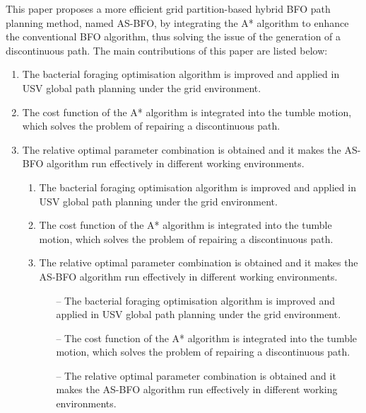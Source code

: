 \documentclass{PDS}%
\theoremstyle{definition}
\begin{document}
This paper proposes a more efficient grid partition-based hybrid BFO path planning
method, named AS-BFO, by integrating the A* algorithm to enhance the conventional
BFO algorithm, thus solving the issue of the generation of a discontinuous path. The main
contributions of this paper are listed below:
\begin{enumerate}
\item The bacterial foraging optimisation algorithm is improved and applied in USV
global path planning under the grid environment.

\item The cost function of the A* algorithm is integrated into the tumble motion, which
solves the problem of repairing a discontinuous path.

\item The relative optimal parameter combination is obtained and it makes the AS-BFO algorithm
run effectively in different working environments.\begin{enumerate}
\item The bacterial foraging optimisation algorithm is improved and applied in USV
global path planning under the grid environment.

\item The cost function of the A* algorithm is integrated into the tumble motion, which
solves the problem of repairing a discontinuous path.

\item The relative optimal parameter combination is obtained and it makes the AS-BFO algorithm
run effectively in different working environments.

\begin{enumerate}[--]
\item[--] The bacterial foraging optimisation algorithm is improved and applied in USV
global path planning under the grid environment.

\item[--] The cost function of the A* algorithm is integrated into the tumble motion, which
solves the problem of repairing a discontinuous path.

\item[--] The relative optimal parameter combination is obtained and it makes the AS-BFO algorithm
run effectively in different working environments.
\end{enumerate}

\end{enumerate}

\end{enumerate}
\end{document}
